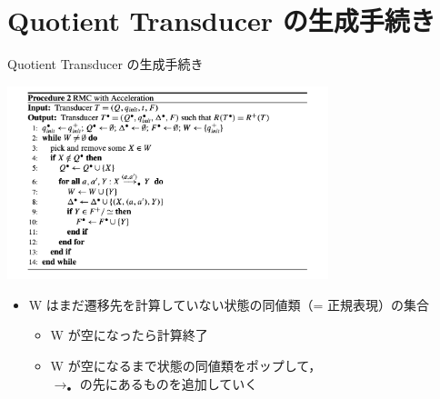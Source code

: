 \documentclass[presentation, xetex]{beamer}
\begin{document}
\section{Quotient Transducer の生成手続き}
\label{sec:orga588c18}

\begin{frame}[label={sec:org1744cb6}]{Quotient Transducer の生成手続き}
\begin{center}
\includegraphics[width=0.7\textwidth]{./images/quoting-rmc.png}
\end{center}

\footnotesize
\begin{itemize}
\item W はまだ遷移先を計算していない状態の同値類（= 正規表現）の集合
\begin{itemize}
\item \footnotesize
W が空になったら計算終了
\item \footnotesize
W が空になるまで状態の同値類をポップして，\\
\(\longrightarrow_\bullet\) の先にあるものを追加していく
\end{itemize}
\end{itemize}
\end{frame}
\end{document}
